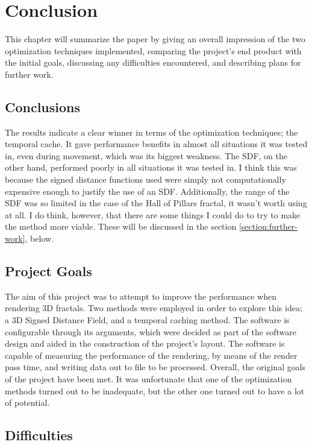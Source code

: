 \chapter{Conclusion}
\label{chapter:conclusion}

This chapter will summarize the paper by giving an overall impression of the two optimization techniques implemented, comparing the project's end product with the initial goals, discussing any difficulties encountered, and describing plans for further work.

\section{Conclusions}

The results indicate a clear winner in terms of the optimization techniques; the temporal cache. It gave performance benefits in almost all situations it was tested in, even during movement, which was its biggest weakness. The SDF, on the other hand, performed poorly in all situations it was tested in. I think this was because the signed distance functions used were simply not computationally expensive enough to justify the use of an SDF. Additionally, the range of the SDF was so limited in the case of the Hall of Pillars fractal, it wasn't worth using at all. I do think, however, that there are some things I could do to try to make the method more viable. These will be discussed in the section \ref{section:further-work}, below.

\section{Project Goals}

The aim of this project was to attempt to improve the performance when rendering 3D fractals. Two methods were employed in order to explore this idea; a 3D Signed Distance Field, and a temporal caching method. The software is configurable through its arguments, which were decided as part of the software design and aided in the construction of the project's layout. The software is capable of measuring the performance of the rendering, by means of the render pass time, and writing data out to file to be processed. Overall, the original goals of the project have been met. It was unfortunate that one of the optimization methods turned out to be inadequate, but the other one turned out to have a lot of potential.

\section{Difficulties}


